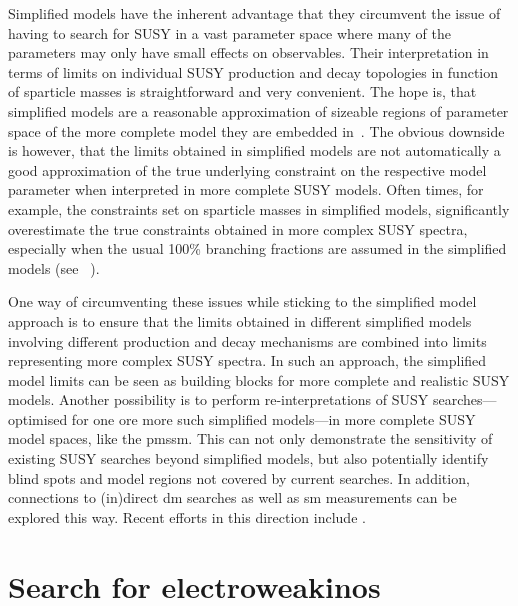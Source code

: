 Simplified models have the inherent advantage that they circumvent the issue of having to search for SUSY in a vast parameter space where many of the parameters may only have small effects on observables. Their interpretation in terms of limits on individual SUSY production and decay topologies in function of sparticle masses is straightforward and very convenient. The hope is, that simplified models are a reasonable approximation of sizeable regions of parameter space of the more complete model they are embedded in~\cite{pdg2020}. The obvious downside is however, that the limits obtained in simplified models are not automatically a good approximation of the true underlying constraint on the respective model parameter when interpreted in more complete SUSY models. Often times, for example, the constraints set on sparticle masses in simplified models, significantly overestimate the true constraints obtained in more complex SUSY spectra, especially when the usual 100\% branching fractions are assumed in the simplified models (see \eg~\cite{Ambrogi:2017lov,Buchmueller:2013exa}).

One way of circumventing these issues while sticking to the simplified model approach is to ensure that the limits obtained in different simplified models involving different production and decay mechanisms are combined into limits representing more complex SUSY spectra. In such an approach, the simplified model limits can be seen as building blocks for more complete and realistic SUSY models. Another possibility is to perform re-interpretations of SUSY searches---optimised for one ore more such simplified models---in more complete SUSY model spaces, like \eg the \gls{pmssm}. This can not only demonstrate the sensitivity of existing SUSY searches beyond simplified models, but also potentially identify blind spots and model regions not covered by current searches. In addition, connections to (in)direct \gls{dm} searches as well as \gls{sm} measurements can be explored this way. Recent efforts in this direction include \eg {}\cite{Ambrogi:2017lov, Aaboud:2016wna, pMSSM-scan-run1:2015baa}.


\section{Search for electroweakinos}

